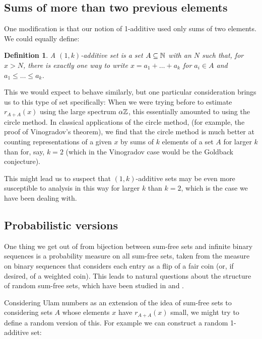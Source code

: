 \documentclass{report}
\newtheorem{definition}[theorem]{Definition}
\theoremstyle{remark}
\numberwithin{equation}{section}
\begin{document}
\subsection{Sums of more than two previous elements}

One modification is that our notion of 1-additive used only sums of
two elements.  We could equally define: 

\begin{definition}\label{def:1k_additive}
A $(1,k)$-additive set is a set $A \subseteq \mathbb{N}$ with an $N$ such
that, for $x > N$, there is exactly one way to write $x = a_1 + \ldots
+ a_k$ for $a_i \in A$ and $a_1 \leq \ldots \leq a_k$.  
\end{definition}

This we would expect to behave similarly, but one particular
consideration brings us to this type of set specifically: When we were
trying before to estimate $r_{A+A}(x)$ using the large spectrum
$\alpha\mathbb{Z}$, this essentially amounted to using the circle method.  In
classical applications of the circle method, (for example, the proof
of Vinogradov's theorem), we find that the circle method is much
better at counting representations of a given $x$ by sums of $k$
elements of a set $A$ for larger $k$ than for, say, $k = 2$ (which in
the Vinogradov case would be the Goldback conjecture).  

This might lead us to suspect that $(1,k)$-additive sets may be even
more susceptible to analysis in this way for larger $k$ than $k = 2$,
which is the case we have been dealing with.

\subsection{Probabilistic versions}

One thing we get out of from bijection between sum-free sets and
infinite binary sequences is a probability measure on all sum-free
sets, taken from the measure on binary sequences that considers each
entry as a flip of a fair coin (or, if desired, of a weighted coin).
This leads to natural questions about the structure of random sum-free
sets, which have been studied in \cite{cameron:ptrf1987} and
\cite{calkin:dm1998}.

Considering Ulam numbers as an extension of the idea of sum-free sets
to considering sets $A$ whose elements $x$ have $r_{A+A}(x)$ small, we
might try to define a random version of this.  For example we can
construct a random 1-additive set: 
\end{document}
